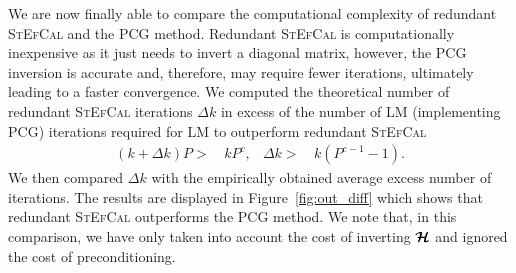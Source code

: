 \documentclass[useAMS,usenatbib]{mn2e}
\newcommand{\bmH}{\bmath{\mathcal{H}}}
\begin{document}
We are now finally able to compare the computational complexity of redundant \textsc{StEfCal} and the PCG method. Redundant \textsc{StEfCal} is computationally inexpensive as it just needs to invert a diagonal matrix, however, the PCG inversion is accurate and, therefore, may require fewer iterations, ultimately leading to a faster convergence. 
We computed the theoretical number of redundant \textsc{StEfCal} iterations $\Delta k$ in excess of the number of LM (implementing PCG) iterations required for LM to outperform redundant \textsc{StEfCal}
\begin{align}
\label{eq:k} 
 (k+\Delta k)P >& \, kP^c, & \Delta k >& \, k(P^{c-1}-1).
\end{align}
We then compared $\Delta k$ with the empirically obtained average excess number of iterations. The results are displayed in Figure~\ref{fig:out_diff} which shows that redundant \textsc{StEfCal} outperforms the PCG method. We note that, in this comparison, we have only taken into account the cost of inverting $\bmH$ and ignored the cost of preconditioning. 
%
\end{document}
